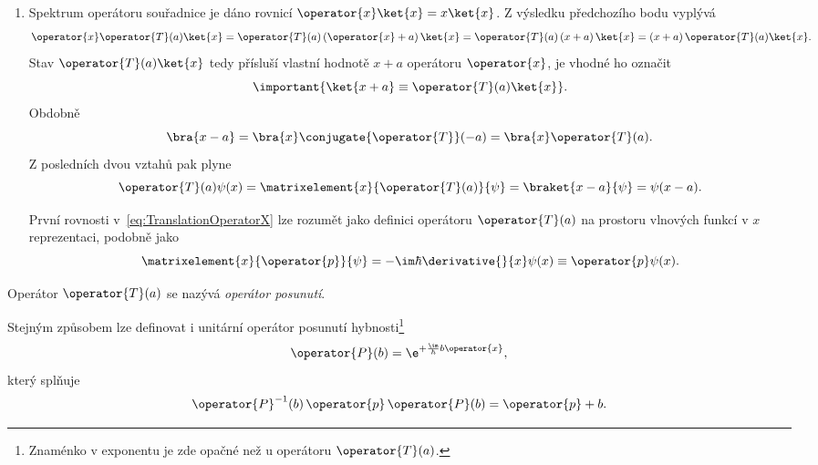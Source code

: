\begin{solution}
\begin{enumerate}
	\item
        Spektrum operátoru souřadnice je dáno rovnicí $\operator{x}\ket{x}=x\ket{x}$.
        Z výsledku předchozího bodu vyplývá
		\begin{equation}
			\operator{x}\operator{T}(a)\ket{x}
				=\operator{T}(a)\left(\operator{x}+a\right)\ket{x}
				=\operator{T}(a)\left(x+a\right)\ket{x}
				=\left(x+a\right)\operator{T}(a)\ket{x}.
		\end{equation}
		Stav $\operator{T}(a)\ket{x}$ tedy přísluší vlastní hodnotě $x+a$ operátoru $\operator{x}$, je vhodné ho označit
		\begin{equation}
			\important{\ket{x+a}
				\equiv\operator{T}(a)\ket{x}}.
		\end{equation}
		Obdobně
		\begin{equation}
			\bra{x-a}
				=\bra{x}\conjugate{\operator{T}}(-a)
				=\bra{x}\operator{T}(a).
		\end{equation}
		Z posledních dvou vztahů pak plyne
		\begin{equation}\label{eq:TranslationOperatorX}
            \operator{T}(a)\psi(x)
                =\matrixelement{x}{\operator{T}(a)}{\psi}
                =\braket{x-a}{\psi}=\psi(x-a).
		\end{equation}
		\begin{note}
			První rovnosti v~\eqref{eq:TranslationOperatorX} lze rozumět jako definici operátoru $\operator{T}(a)$ na prostoru vlnových funkcí v $x$ reprezentaci, podobně jako
			\begin{equation}
				\matrixelement{x}{\operator{p}}{\psi}
					=-\im\hbar\derivative{}{x}\psi(x)\equiv\operator{p}\psi(x).
			\end{equation}
		\end{note}
	\end{enumerate}
\end{solution}

\begin{note}
	Operátor $\operator{T}(a)$ se nazývá \emph{operátor posunutí}.
\end{note}

\begin{note}
	Stejným způsobem lze definovat i unitární operátor posunutí hybnosti\footnote{Znaménko v exponentu je zde opačné než u operátoru $\operator{T}(a)$.}
	\begin{equation}
		\label{eq:MomentumTranslationOperator}
		\operator{P}(b)
			=\e^{+\frac{\im}{\hbar}b\operator{x}},
	\end{equation}
	který splňuje
	\begin{equation}
		\operator{P}^{-1}(b)\,\operator{p}\,\operator{P}(b)
			=\operator{p}+b.
	\end{equation}

\end{note}